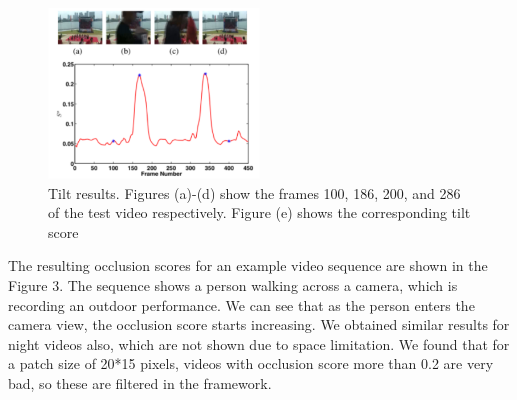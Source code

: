\documentclass{sig-alternate}
\begin{document}
\begin{figure}[h]
    \centering
    \includegraphics[width=0.5\textwidth]{img3.png}
    \caption{Tilt results. Figures (a)-(d) show the frames 100, 186,
200, and 286 of the test video respectively. Figure (e) shows the
corresponding tilt score}
    \label{fig:mesh4}
\end{figure}

The resulting occlusion scores for an example video sequence
are shown in the Figure 3. The sequence shows a person walking
across a camera, which is recording an outdoor performance. We
can see that as the person enters the camera view, the occlusion
score starts increasing. We obtained similar results for night videos
also, which are not shown due to space limitation. We found that
for a patch size of 20*15 pixels, videos with occlusion score more
than 0.2 are very bad, so these are filtered in the framework.
\end{document}
